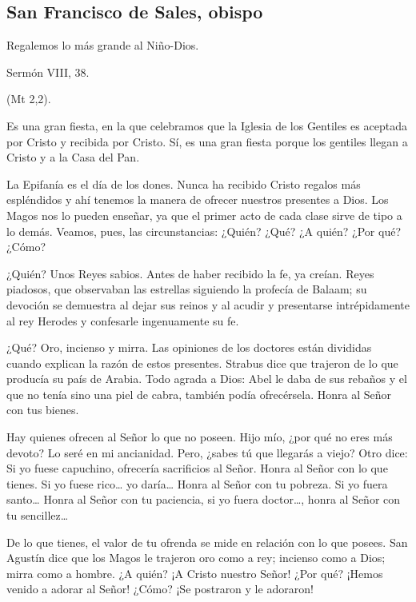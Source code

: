 \subsection{San Francisco de Sales, obispo}

Regalemos lo más grande al Niño-Dios.

Sermón VIII, 38.

 (Mt 2,2).

Es una gran fiesta, en la que celebramos que la Iglesia de los Gentiles es aceptada por Cristo y recibida por Cristo. Sí, es una gran fiesta porque los gentiles llegan a Cristo y a la Casa del Pan.

La Epifanía es el día de los dones. Nunca ha recibido Cristo regalos más espléndidos y ahí tenemos la manera de ofrecer nuestros presentes a Dios. Los Magos nos lo pueden enseñar, ya que el primer acto de cada clase sirve de tipo a lo demás. Veamos, pues, las circunstancias: ¿Quién? ¿Qué? ¿A quién? ¿Por qué? ¿Cómo?

¿Quién? Unos Reyes sabios. Antes de haber recibido la fe, ya creían. Reyes piadosos, que observaban las estrellas siguiendo la profecía de Balaam; su devoción se demuestra al dejar sus reinos y al acudir y presentarse intrépidamente al rey Herodes y confesarle ingenuamente su fe.

¿Qué? Oro, incienso y mirra. Las opiniones de los doctores están divididas cuando explican la razón de estos presentes. Strabus dice que trajeron de lo que producía su país de Arabia. Todo agrada a Dios: Abel le daba de sus rebaños y el que no tenía sino una piel de cabra, también podía ofrecérsela. Honra al Señor con tus bienes.

Hay quienes ofrecen al Señor lo que no poseen. Hijo mío, ¿por qué no eres más devoto? Lo seré en mi ancianidad. Pero, ¿sabes tú que llegarás a viejo? Otro dice: Si yo fuese capuchino, ofrecería sacrificios al Señor. Honra al Señor con lo que tienes. Si yo fuese rico\ldots{} yo daría\ldots{} Honra al Señor con tu pobreza. Si yo fuera santo\ldots{} Honra al Señor con tu paciencia, si yo fuera doctor\ldots{}, honra al Señor con tu sencillez\ldots{}

De lo que tienes, el valor de tu ofrenda se mide en relación con lo que posees. San Agustín dice que los Magos le trajeron oro como a rey; incienso como a Dios; mirra como a hombre. ¿A quién? ¡A Cristo nuestro Señor! ¿Por qué? ¡Hemos venido a adorar al Señor! ¿Cómo? ¡Se postraron y le adoraron!

